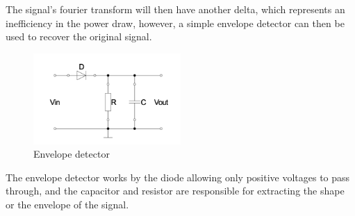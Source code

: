 The signal's fourier transform will then have another delta, which represents an inefficiency in the power draw, however, a simple envelope detector can then be used to recover the original signal.

\begin{figure}[H]
    \centering
    \includegraphics[width=0.5\textwidth]{images/intro_envelope_detector.png}
    \caption{Envelope detector}
    \label{fig:intro_envelope_detector}
\end{figure}

The envelope detector works by the diode allowing only positive voltages to pass through, and the capacitor and resistor are responsible for extracting the shape or the envelope of the signal.